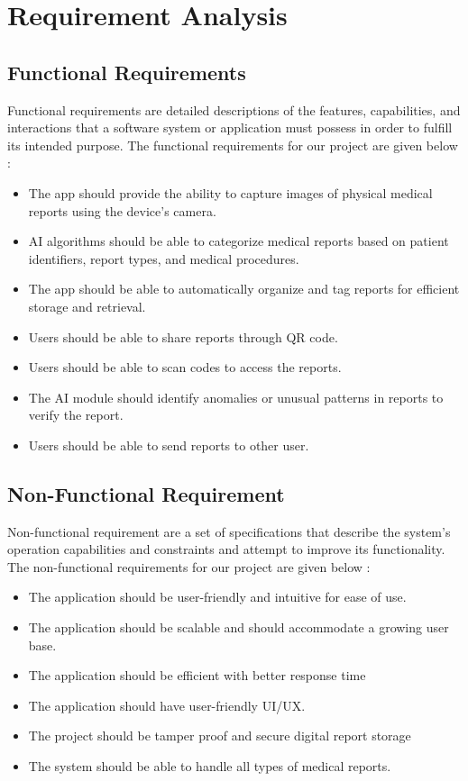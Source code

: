 \chapter{Requirement Analysis}\label{ch:req_analysis}
\section{Functional Requirements}
Functional requirements are detailed descriptions of the features, capabilities, and interactions that a software system or application must possess in order to fulfill its intended purpose. The functional requirements for our project are given below :
\begin{itemize}
    \item The app should provide the ability to capture images of physical medical reports using the device's camera.
    \item AI algorithms should be able to categorize medical reports based on patient identifiers, report types, and medical procedures.
    \item The app should be able to automatically organize and tag reports for efficient storage and retrieval.
    \item Users should be able to share reports through QR code.
    \item Users should be able to scan codes to access the reports.
    \item The AI module should identify anomalies or unusual patterns in reports to verify the report.
    \item Users should be able to send reports to other user.
\end{itemize}

\section{Non-Functional Requirement}
Non-functional requirement are a set of specifications that describe the system's operation capabilities and constraints and attempt to improve its functionality.
The non-functional requirements for our project are given below :
\begin{itemize}
    \item The application should be user-friendly and intuitive for ease of use.
    \item The application should be scalable and should accommodate a growing user base.
    \item The application should be efficient with better response time
    \item The application should have user-friendly UI/UX.
    \item The project should be tamper proof and secure digital report storage
    \item The system should be able to handle all types of medical reports.
\end{itemize}


